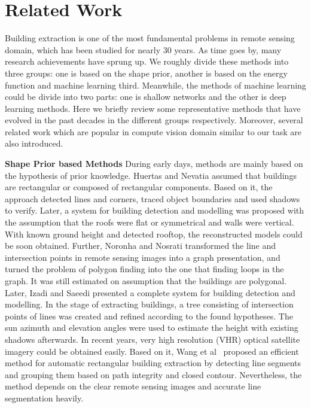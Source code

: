 \section{Related Work}
\label{Sec:RelatedWork}


Building extraction is one of the most fundamental problems in remote sensing domain, which has been studied for nearly 30 years.
As time goes by, many research achievements have sprung up.
We roughly divide these methods into three groups: one is based on the shape prior, another is based on the energy function and machine learning third. Meanwhile, the methods of machine learning could be divide into two parts: one is shallow networks and the other is deep learning methods.
Here we briefly review some representative methods that have evolved in the past decades in the different groups respectively.
Moreover, several related work which are popular in compute vision domain similar to our task are also introduced.



\textbf{Shape Prior based Methods} During early days, methods are mainly based on the hypothesis of prior knowledge.
Huertas and Nevatia \cite{IEEEexample:huertas1988detecting} assumed that buildings are rectangular or composed of rectangular components.
Based on it, the approach detected lines and corners, traced object boundaries and used shadows to verify.
Later, a system \cite{IEEEexample:noronha2001detection} for building detection and modelling was proposed with the assumption that the roofs were flat or symmetrical and walls were vertical.
With known ground height and detected rooftop, the reconstructed models could be soon obtained.
Further, Noronha and Nosrati \cite{IEEEexample:nosrati2009novel} transformed the line and intersection points in remote sensing images into a graph presentation, and turned the problem of polygon finding into the one that finding loops in the graph.
It was still estimated on assumption that the buildings are polygonal.
Later, Izadi and Saeedi\cite{IEEEexample:izadi2012three} presented a complete system for building detection and modelling.
In the stage of extracting buildings, a tree consisting of intersection points of lines was created and refined according to the found hypotheses.
The sun azimuth and elevation angles were used to estimate the height with existing shadows afterwards.
In recent years, very high resolution (VHR) optical satellite imagery could be obtained easily.
Based on it, Wang et al~\cite{IEEEexample:wang2015efficient} proposed an efficient method for automatic rectangular building extraction by detecting line segments and grouping them based on path integrity and closed contour. Nevertheless, the method depends on the clear remote sensing images and accurate line segmentation heavily.


